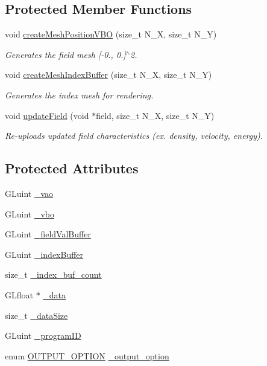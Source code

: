 \subsection*{Protected Member Functions}
\begin{DoxyCompactItemize}
\item 
void \hyperlink{class_field_object_a059a05b427c9231642913aee67768613}{create\+Mesh\+Position\+V\+BO} (size\+\_\+t N\+\_\+X, size\+\_\+t N\+\_\+Y)
\begin{DoxyCompactList}\small\item\em Generates the field mesh \mbox{[}-\/0., 0.\mbox{]}$^\wedge$2. \end{DoxyCompactList}\item 
void \hyperlink{class_field_object_a33d5a7b1230bc5b9d5f29b2762d9d002}{create\+Mesh\+Index\+Buffer} (size\+\_\+t N\+\_\+X, size\+\_\+t N\+\_\+Y)
\begin{DoxyCompactList}\small\item\em Generates the index mesh for rendering. \end{DoxyCompactList}\item 
void \hyperlink{class_field_object_ae44fb6a929a1a14815f8c9757c75bdf1}{update\+Field} (void $\ast$field, size\+\_\+t N\+\_\+X, size\+\_\+t N\+\_\+Y)
\begin{DoxyCompactList}\small\item\em Re-\/uploads updated field characteristics (ex. density, velocity, energy). \end{DoxyCompactList}\end{DoxyCompactItemize}
\subsection*{Protected Attributes}
\begin{DoxyCompactItemize}
\item 
G\+Luint \hyperlink{class_field_object_ae6ae1217e025ba7aaf4de62edb227d88}{\+\_\+vao}
\item 
G\+Luint \hyperlink{class_field_object_a1203d3948925d7c456ba18af4cb419f7}{\+\_\+vbo}
\item 
G\+Luint \hyperlink{class_field_object_a0c38722ea5628f3c87a0122570542490}{\+\_\+field\+Val\+Buffer}
\item 
G\+Luint \hyperlink{class_field_object_a8bdf4e9d88a422e080ded80fe3c7ae08}{\+\_\+index\+Buffer}
\item 
size\+\_\+t \hyperlink{class_field_object_a737157aec4185354f55ccd36b8786461}{\+\_\+index\+\_\+buf\+\_\+count}
\item 
G\+Lfloat $\ast$ \hyperlink{class_field_object_a940f8cc7e3294eb89014f0cee8ccbc41}{\+\_\+data}
\item 
size\+\_\+t \hyperlink{class_field_object_a62d22516449ba4c71438dd635c18b4e3}{\+\_\+data\+Size}
\item 
G\+Luint \hyperlink{class_field_object_a6c5c454cefffe4c094bb2e015c2f1cae}{\+\_\+program\+ID}
\item 
enum \hyperlink{offscreen_8h_a29ac838d689ab5ed87b591138936e615}{O\+U\+T\+P\+U\+T\+\_\+\+O\+P\+T\+I\+ON} \hyperlink{class_field_object_ac389b983df486fe3eac03de5825d1a35}{\+\_\+output\+\_\+option}
\end{DoxyCompactItemize}


